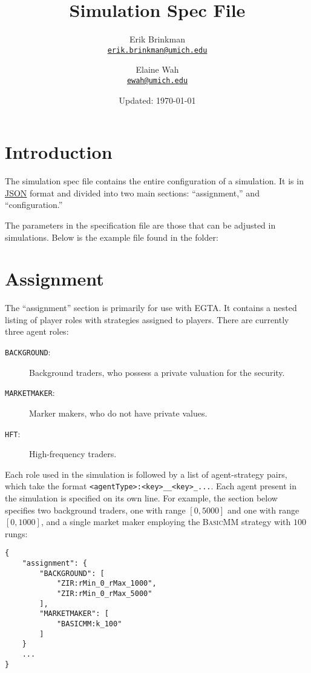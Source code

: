 \documentclass[11pt]{article}
\newcommand{\email}[1]{\href{mailto:#1}{\texttt{#1}}}
\begin{document}
	
\title{Simulation Spec File}
\author{
  Erik Brinkman \\
  \email{erik.brinkman@umich.edu}
  \and
  Elaine Wah \\
  \email{ewah@umich.edu}
}
\date{Updated: \today}
\maketitle

\section{Introduction}

The simulation spec file contains the entire configuration of a simulation. It
is in \href{https://en.wikipedia.org/wiki/Json}{JSON} format and divided into
two main sections: ``assignment,'' and ``configuration.''

The parameters in the specification file are those that can be adjusted in
simulations. Below is the example  file found in
the  folder:



\section{Assignment}

The ``assignment'' section is primarily for use with EGTA. It contains a
nested listing of player roles with strategies assigned to players. 
%
There are currently three agent roles:
 \begin{description}
  \item[\texttt{BACKGROUND}:] Background traders, who possess a private valuation for the security.
  \item[\texttt{MARKETMAKER}:] Marker makers, who do not have private values.
  \item[\texttt{HFT}:] High-frequency traders.
  \end{description}

Each role used in the simulation is followed by a list of agent-strategy pairs, which take the format \texttt{<agentType>:<key>\_<value1>\_<key>\_<value2>...}. Each agent present in the simulation is specified on its own line.
%
For example, the section below specifies two background traders, one with range $[0, 5000]$ and one with range $[0, 1000]$, and a single market maker employing the \textsc{BasicMM} strategy with $100$ rungs:
%
\begin{lstlisting}
{
    "assignment": {
        "BACKGROUND": [
            "ZIR:rMin_0_rMax_1000",
            "ZIR:rMin_0_rMax_5000"
        ],
        "MARKETMAKER": [
            "BASICMM:k_100"
        ]
    }
    ...
}
\end{lstlisting}
\end{document}
